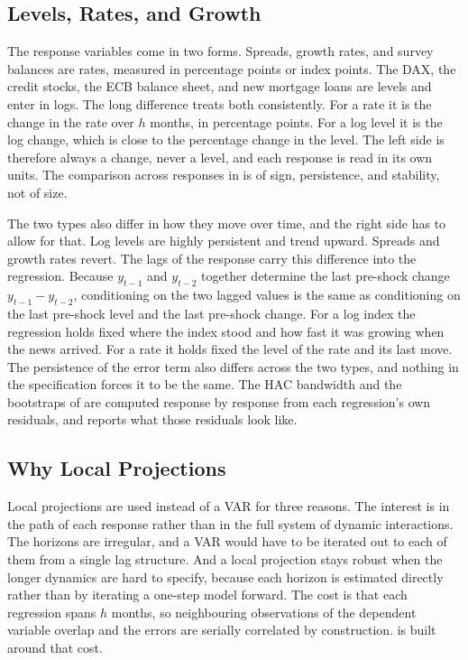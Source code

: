 \subsection{Levels, Rates, and Growth}

The response variables come in two forms. Spreads, growth rates, and survey balances are rates, measured in percentage points or index points. The DAX, the credit stocks, the ECB balance sheet, and new mortgage loans are levels and enter in logs. The long difference treats both consistently. For a rate it is the change in the rate over \(h\) months, in percentage points. For a log level it is the log change, which is close to the percentage change in the level. The left side is therefore always a change, never a level, and each response is read in its own units. The comparison across responses in  is of sign, persistence, and stability, not of size.

The two types also differ in how they move over time, and the right side has to allow for that. Log levels are highly persistent and trend upward. Spreads and growth rates revert. The lags of the response carry this difference into the regression. Because \(y_{t-1}\) and \(y_{t-2}\) together determine the last pre-shock change \(y_{t-1} - y_{t-2}\), conditioning on the two lagged values is the same as conditioning on the last pre-shock level and the last pre-shock change. For a log index the regression holds fixed where the index stood and how fast it was growing when the news arrived. For a rate it holds fixed the level of the rate and its last move. The persistence of the error term also differs across the two types, and nothing in the specification forces it to be the same. The HAC bandwidth and the bootstraps of  are computed response by response from each regression's own residuals, and  reports what those residuals look like.

\subsection{Why Local Projections}

Local projections are used instead of a VAR for three reasons. The interest is in the path of each response rather than in the full system of dynamic interactions. The horizons are irregular, and a VAR would have to be iterated out to each of them from a single lag structure. And a local projection stays robust when the longer dynamics are hard to specify, because each horizon is estimated directly rather than by iterating a one-step model forward. The cost is that each regression spans \(h\) months, so neighbouring observations of the dependent variable overlap and the errors are serially correlated by construction.  is built around that cost.

